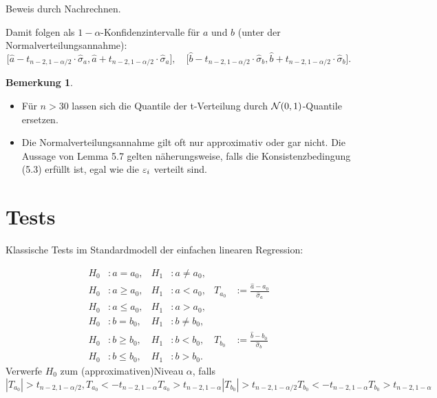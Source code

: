 \documentclass[
 a4paper,
 12pt,
 parskip=half
 ]{scrreprt}
\theoremstyle{plain}
\theoremstyle{definition}
\newtheorem*{rmrk*}{Bemerkung}
\numberwithin{equation}{chapter}
\begin{document}
Beweis durch Nachrechnen.

Damit folgen als $1-\alpha$-Konfidenzintervalle für $a$ und $b$ (unter der
Normalverteilungsannahme):
\[ \big[ \hat{a} - t_{n-2,1-\alpha/2} \cdot \hat{\sigma}_a,
    \hat{a} + t_{n-2,1-\alpha/2} \cdot \hat{\sigma}_a \big], \quad
 \big[ \hat{b} - t_{n-2,1-\alpha/2} \cdot \hat{\sigma}_b,
 \hat{b} + t_{n-2,1-\alpha/2} \cdot \hat{\sigma}_b \big]. \]

\begin{rmrk*}
  \begin{itemize}
  \item Für $n > 30$ lassen sich die Quantile der t-Verteilung durch
    $\mathcal{N}(0,1)$-Quantile ersetzen.
  \item Die Normalverteilungsannahme gilt oft nur approximativ oder gar nicht.
    Die Aussage von Lemma 5.7 gelten näherungsweise, falls die
    Konsistenzbedingung (5.3) erfüllt ist, egal wie die $\varepsilon_i$ verteilt sind.
  \end{itemize}
\end{rmrk*}

\section{Tests}
Klassische Tests im Standardmodell der einfachen linearen Regression:
\begin{mdframed}
  \begin{align*}
    H_0 &: a = a_0, & H_1 &: a \ne a_0, \\
    H_0 &: a \ge a_0, & H_1 &: a < a_0, & T_{a_0}
                      &:= \frac{\hat{a} - a_0}{\hat{\sigma}_a} \\
    H_0 &: a \le a_0, & H_1 &: a > a_0, \\[1em]
    H_0 &: b = b_0, & H_1 &: b \ne b_0, \\
    H_0 &: b \ge b_0, & H_1 &: b < b_0, & T_{b_0}
                      &:= \frac{\hat{b} - b_0}{\hat{\sigma}_b} \\
    H_0 &: b \le b_0, & H_1 &: b > b_0.
  \end{align*}
  Verwerfe $H_0$ zum (approximativen)\footnotemark Niveau $\alpha$, falls
  \[ |T_{a_0}| > t_{n-2, 1 - \alpha/2},
    T_{a_0} < - t_{n-2, 1 - \alpha}
    T_{a_0} > t_{n-2, 1 - \alpha}
    |T_{b_0}| > t_{n-2, 1 - \alpha/2}
    T_{b_0} < - t_{n-2, 1 - \alpha}
    T_{b_0} > t_{n-2, 1 - \alpha}
  \]
\end{mdframed}
\end{document}
